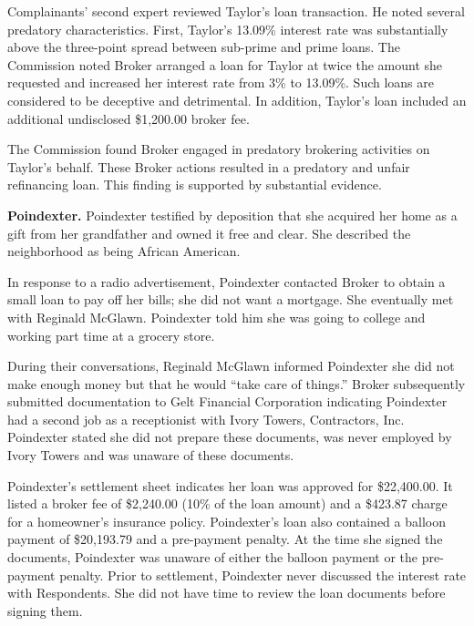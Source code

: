 Complainants' second expert reviewed Taylor's loan transaction. He noted several
predatory characteristics. First, Taylor's 13.09\% interest rate was
substantially above the three-point spread between sub-prime and prime loans.
The Commission noted Broker arranged a loan for Taylor at twice the amount she
requested and increased her interest rate from 3\% to 13.09\%. Such loans are
considered to be deceptive and
detrimental. In
addition, Taylor's loan included an additional undisclosed \$1,200.00 broker
fee. 

The Commission found Broker engaged in predatory brokering activities on
Taylor's behalf. These Broker actions resulted in a predatory and unfair
refinancing loan. This finding is supported by substantial evidence.

\textbf{Poindexter.} Poindexter testified by deposition that she acquired her
home as a gift from her grandfather and owned it free and clear. She described
the neighborhood as being African American. 

In response to a radio advertisement, Poindexter contacted Broker to obtain a
small loan to pay off her bills; she did not want a mortgage. She eventually
met with Reginald McGlawn. Poindexter told him she was going to college and
working part time at a grocery store. 

During their conversations, Reginald McGlawn informed Poindexter she did not
make enough money but that he would ``take care of things.'' Broker
subsequently submitted documentation to Gelt Financial Corporation indicating
Poindexter had a second job as a receptionist with Ivory Towers, Contractors,
Inc. Poindexter stated she did not prepare these documents, was never employed
by Ivory Towers and was unaware of these documents. 

Poindexter's settlement sheet indicates her loan was approved for \$22,400.00.
It listed a broker fee of \$2,240.00 (10\% of the loan amount) and a \$423.87
charge for a homeowner's insurance policy. Poindexter's loan also contained a
balloon payment of \$20,193.79 and a pre-payment penalty. At the time she
signed the documents, Poindexter was unaware of either the balloon payment or
the pre-payment penalty. Prior to settlement, Poindexter never discussed the
interest rate with Respondents. She did not have time to review the loan
documents before signing them. 

